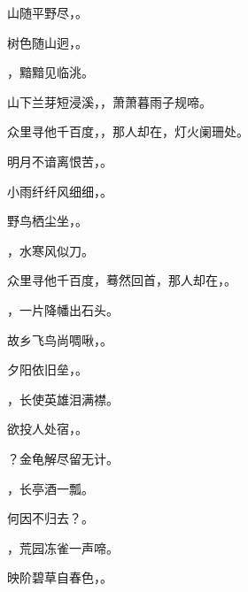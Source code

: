 \documentclass[12pt, a4paper, addpoints]{exam}
\begin{document}
\begin{questions}
\question[1] 山随平野尽，\uline{\qquad\qquad\qquad}。

\question[1] 树色随山迥，\uline{\qquad\qquad\qquad}。

\question[1] \uline{\qquad\qquad\qquad}，黯黯见临洮。

\question[1] 山下兰芽短浸溪，\uline{\qquad\qquad\qquad}，萧萧暮雨子规啼。

\question[1] 众里寻他千百度，\uline{\qquad\qquad\qquad}，那人却在，灯火阑珊处。

\question[1] 明月不谙离恨苦，\uline{\qquad\qquad\qquad}。

\question[1] 小雨纤纤风细细，\uline{\qquad\qquad\qquad}。

\question[1] 野鸟栖尘坐，\uline{\qquad\qquad\qquad}。

\question[1] \uline{\qquad\qquad\qquad}，水寒风似刀。

\question[1] 众里寻他千百度，蓦然回首，那人却在，\uline{\qquad\qquad\qquad}。

\question[1] \uline{\qquad\qquad\qquad}，一片降幡出石头。

\question[1] 故乡飞鸟尚啁啾，\uline{\qquad\qquad\qquad}。

\question[1] 夕阳依旧垒，\uline{\qquad\qquad\qquad}。

\question[1] \uline{\qquad\qquad\qquad}，长使英雄泪满襟。

\question[1] 欲投人处宿，\uline{\qquad\qquad\qquad}。

\question[1] \uline{\qquad\qquad\qquad}？金龟解尽留无计。

\question[1] \uline{\qquad\qquad\qquad}，长亭酒一瓢。

\question[1] 何因不归去？\uline{\qquad\qquad\qquad}。

\question[1] \uline{\qquad\qquad\qquad}，荒园冻雀一声啼。

\question[1] 映阶碧草自春色，\uline{\qquad\qquad\qquad}。

\end{questions}
\end{document}
